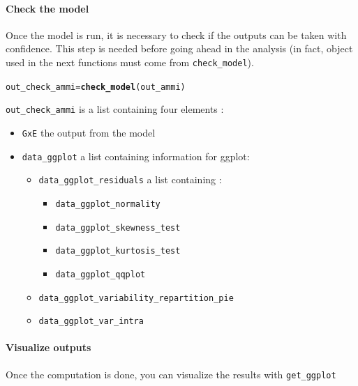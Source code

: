 \documentclass{article}\usepackage[]{graphicx}\usepackage[]{color}
\makeatletter
\newcommand{\hlstd}[1]{\textcolor[rgb]{0.345,0.345,0.345}{#1}}%
\newcommand{\hlkwb}[1]{\textcolor[rgb]{0.69,0.353,0.396}{#1}}%
\newcommand{\hlkwd}[1]{\textcolor[rgb]{0.737,0.353,0.396}{\textbf{#1}}}%
\newenvironment{kframe}{%
 \def\at@end@of@kframe{}%
 \ifinner\ifhmode%
  \def\at@end@of@kframe{\end{minipage}}%
  \begin{minipage}{\columnwidth}%
 \fi\fi%
 \def\FrameCommand##1{\hskip\@totalleftmargin \hskip-\fboxsep
 \colorbox{shadecolor}{##1}\hskip-\fboxsep
     \hskip-\linewidth \hskip-\@totalleftmargin \hskip\columnwidth}%
 \MakeFramed {\advance\hsize-\width
   \@totalleftmargin\z@ \linewidth\hsize
   \@setminipage}}%
 {\par\unskip\endMakeFramed%
 \at@end@of@kframe}
\newenvironment{knitrout}{}{} %
\makeatother
\begin{document}
\paragraph{Check the model}

Once the model is run, it is necessary to check if the outputs can be taken with confidence.
This step is needed before going ahead in the analysis (in fact, object used in the next functions must come from \texttt{check\_model}).

\begin{knitrout}
\color{fgcolor}\begin{kframe}
\begin{alltt}
\hlstd{out_check_ammi} \hlkwb{=} \hlkwd{check_model}\hlstd{(out_ammi)}
\end{alltt}
\end{kframe}
\end{knitrout}

\texttt{out\_check\_ammi} is a list containing four elements :

\begin{itemize}
\item \texttt{GxE} the output from the model
\item \texttt{data\_ggplot} a list containing information for ggplot:
  \begin{itemize}
  \item \texttt{data\_ggplot\_residuals} a list containing :
    \begin{itemize}
    \item \texttt{data\_ggplot\_normality}
    \item \texttt{data\_ggplot\_skewness\_test}
    \item \texttt{data\_ggplot\_kurtosis\_test}
    \item \texttt{data\_ggplot\_qqplot}
    \end{itemize}
  \item \texttt{data\_ggplot\_variability\_repartition\_pie}
  \item \texttt{data\_ggplot\_var\_intra}
  \end{itemize}
\end{itemize}

\paragraph{Visualize outputs}

Once the computation is done, you can visualize the results with \texttt{get\_ggplot}
\end{document}
